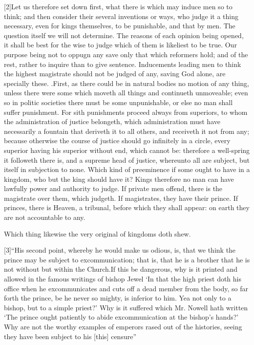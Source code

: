 [2]Let us therefore set down first, what there is which may induce men so to think; and then consider their several inventions or ways, who judge it a thing necessary, even for kings themselves, to be punishable, and that by men. The question itself we will not determine. The reasons of each opinion being opened, it shall be best for the wise to judge which of them is likeliest to be true. Our purpose being not to oppugn any save only that which reformers hold; and of the rest, rather to inquire than to give sentence. Inducements leading men to think the highest magistrate should not be judged of any, saving God alone, are specially these. .First, as there could be in natural bodies no motion of any thing, unless there were some which moveth all things and continueth unmoveable; even so in politic societies there must be some unpunishable, or else no man shall suffer punishment. For sith punishments proceed always from superiors, to whom the administration of justice belongeth, which administration must have necessarily a fountain that deriveth it to all others, and receiveth it not from any; because otherwise the course of justice should go infinitely in a circle, every superior having his superior without end, which cannot be: therefore a well-spring it followeth there is, and a supreme head of justice,  whereunto all are subject, but itself in subjection to none. Which kind of preeminence if some ought to have in a kingdom, who but the king should have it? Kings therefore no man can have lawfully power and authority to judge. If private men offend, there is the magistrate over them, which judgeth. If magistrates, they have their prince. If princes, there is Heaven, a tribunal, before which they shall appear: on earth they are not accountable to any.

Which thing likewise the very original of kingdoms doth shew.



[3]“His second point, whereby he would make us odious, is, that we think the prince may be subject to excommunication; that is, that he is a brother that he is not without but within the Church.If this be dangerous, why is it printed and allowed in the famous writings of bishop Jewel ‘In that the high priest doth his office when he excommunicates and cuts off a dead member from the body, so far forth the prince, be he never so mighty, is inferior to him. Yea not only to a bishop, but to a simple priest?’ Why is it suffered which Mr. Nowell hath written ‘The prince ought patiently to abide excommunication at the bishop’s hands?’ Why are not the worthy examples of emperors rased out of the histories, seeing they have been subject to his [this] censure”


